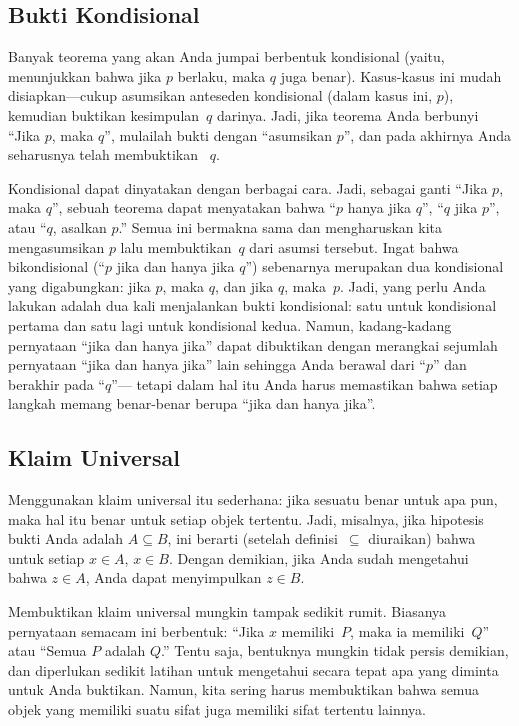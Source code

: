 \documentclass[../../../include/open-logic-section]{subfiles}
\begin{document}
\subsection{Bukti Kondisional}

Banyak teorema yang akan Anda jumpai berbentuk kondisional (yaitu,
menunjukkan bahwa jika $p$ berlaku, maka $q$ juga benar). Kasus-kasus
ini mudah disiapkan---cukup asumsikan anteseden kondisional (dalam
kasus ini, $p$), kemudian buktikan kesimpulan~$q$ darinya. Jadi, jika
teorema Anda berbunyi ``Jika $p$, maka $q$'', mulailah bukti dengan
``asumsikan $p$'', dan pada akhirnya Anda seharusnya telah membuktikan
~$q$.

Kondisional dapat dinyatakan dengan berbagai cara. Jadi, sebagai ganti
``Jika $p$, maka $q$'', sebuah teorema dapat menyatakan bahwa ``$p$
hanya jika $q$'', ``$q$ jika $p$'', atau ``$q$, asalkan $p$.'' Semua
ini bermakna sama dan mengharuskan kita mengasumsikan $p$ lalu
membuktikan~$q$ dari asumsi tersebut. Ingat bahwa bikondisional (``$p$
jika dan hanya jika $q$'') sebenarnya merupakan dua kondisional yang
digabungkan: jika $p$, maka $q$, dan jika $q$, maka~$p$. Jadi, yang
perlu Anda lakukan adalah dua kali menjalankan bukti kondisional: satu
untuk kondisional pertama dan satu lagi untuk kondisional kedua.
Namun, kadang-kadang pernyataan ``jika dan hanya jika'' dapat
dibuktikan dengan merangkai sejumlah pernyataan ``jika dan hanya jika''
lain sehingga Anda berawal dari ``$p$'' dan berakhir pada ``$q$''---
tetapi dalam hal itu Anda harus memastikan bahwa setiap langkah
memang benar-benar berupa ``jika dan hanya jika''.

\subsection{Klaim Universal}

Menggunakan klaim universal itu sederhana: jika sesuatu benar untuk
apa pun, maka hal itu benar untuk setiap objek tertentu. Jadi,
misalnya, jika hipotesis bukti Anda adalah $A \subseteq B$, ini berarti
(setelah definisi~$\subseteq$ diuraikan) bahwa untuk setiap $x \in A$,
$x \in B$. Dengan demikian, jika Anda sudah mengetahui bahwa $z \in
A$, Anda dapat menyimpulkan $z \in B$.

Membuktikan klaim universal mungkin tampak sedikit rumit. Biasanya
pernyataan semacam ini berbentuk: ``Jika $x$ memiliki~$P$, maka ia
memiliki~$Q$'' atau ``Semua $P$ adalah $Q$.'' Tentu saja, bentuknya
mungkin tidak persis demikian, dan diperlukan sedikit latihan untuk
mengetahui secara tepat apa yang diminta untuk Anda buktikan. Namun,
kita sering harus membuktikan bahwa semua objek yang memiliki suatu
sifat juga memiliki sifat tertentu lainnya.
\end{document}
